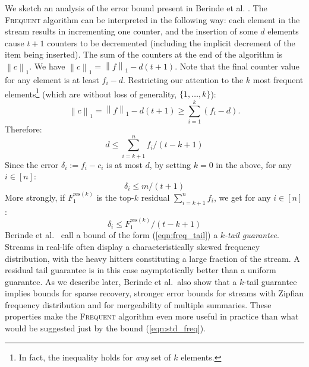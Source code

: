 \documentclass{article}
\newcommand\norm[1]{\left\lVert#1\right\rVert}
\begin{document}
\begin{multicols}{2}
We sketch an analysis of the error bound present in Berinde et al. \cite{BCIS}. 
The \textsc{Frequent} algorithm can be interpreted in the following way:
    each element in the stream results in incrementing one counter, and the insertion of some $d$ elements cause $t+1$ counters to be decremented (including the implicit decrement of the item being inserted). The sum
    of the counters at the end of the algorithm is $\norm{c}_1$. We have
   		 $\norm{c}_1 = \norm{f}_1 - d(t+1)$.
  Note that the final counter value for any element is at least  $f_i - d$. Restricting our attention to the $k$ most frequent elements\footnote{In fact, the inequality holds for {\em any} set of $k$ elements.} (which are without loss of generality, $\{1, \dots, k\}$): 
    $$\norm{c}_1 = \norm{f}_1 - d(t+1) \geq \sum_{i=1}^k(f_i-d).$$
 Therefore:
\begin{equation}
d \leq \sum_{i=k+1}^n f_i/(t-k+1)
\end{equation}
Since the error $\delta_i := f_i - c_i$ is at most $d$, by setting $k = 0$ in the above, for any $i \in [n]$:
\begin{equation}\label{eqn:std_freq}
\delta_i \leq m/(t+1)
\end{equation}
More strongly, if $F_1^{\text{res}(k)}$ is the top-$k$ residual $\sum_{i=k+1}^n f_i$, we get for any $i \in [n]$:
\begin{equation}\label{eqn:freq_tail}
\delta_i \leq F_1^{\text{res}(k)}/(t - k+1)
\end{equation}
Berinde et al.~\cite{BCIS} call a bound of the form (\ref{eqn:freq_tail}) a {\em $k$-tail guarantee}. 
Streams in real-life often display a characteristically skewed frequency distribution, with the heavy hitters
constituting a large fraction of the stream. A residual tail guarantee is in this case asymptotically better than a uniform guarantee.
As we describe later, Berinde et al.~also show that a $k$-tail guarantee implies bounds for {sparse recovery}, stronger error bounds for streams with Zipfian frequency distribution and for mergeability of multiple summaries. These properties make the \textsc{Frequent} algorithm even more useful in practice than what would be suggested just by the bound (\ref{eqn:std_freq}).



\end{multicols}
\end{document}
